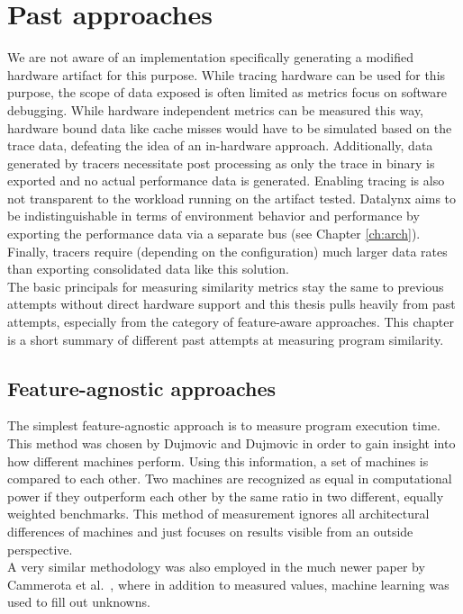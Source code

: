 \documentclass[../bachelor_paper.tex]{subfiles}
\begin{document}
\chapter{Past approaches}
	\label{ch:prob}
We are not aware of an implementation specifically generating a modified hardware artifact for this purpose. While tracing hardware can be used for this purpose, the scope of data exposed is often limited as metrics focus on software debugging. While hardware independent metrics can be measured this way, hardware bound data like cache misses would have to be simulated based on the trace data, defeating the idea of an in-hardware approach. Additionally, data generated by tracers necessitate post processing as only the trace in binary is exported and no actual performance data is generated. Enabling tracing is also not transparent to the workload running on the artifact tested. Datalynx aims to be indistinguishable in terms of environment behavior and performance by exporting the performance data via a separate bus (see Chapter \ref{ch:arch}). Finally, tracers require (depending on the configuration) much larger data rates than exporting consolidated data like this solution. \\
The basic principals for measuring similarity metrics stay the same to previous attempts without direct hardware support and this thesis pulls heavily from past attempts, especially from the category of feature-aware approaches. This chapter is a short summary of different past attempts at measuring program similarity.

\section{Feature-agnostic approaches}
	\label{sec:prob/agno}
The simplest feature-agnostic approach is to measure program execution time. This method was chosen by Dujmovic and Dujmovic \cite{dujmovicEvolutionEvaluationSPEC1998} in order to gain insight into how different machines perform. Using this information, a set of machines is compared to each other. Two machines are recognized as equal in computational power if they outperform each other by the same ratio in two different, equally weighted benchmarks. This method of measurement ignores all architectural differences of machines and just focuses on results visible from an outside perspective.\\
A very similar methodology was also employed in the much newer paper by Cammerota et al.\ \cite{cammarotaOptimizingProgramPerformance2013}, where in addition to measured values, machine learning was used to fill out unknowns.
\end{document}
